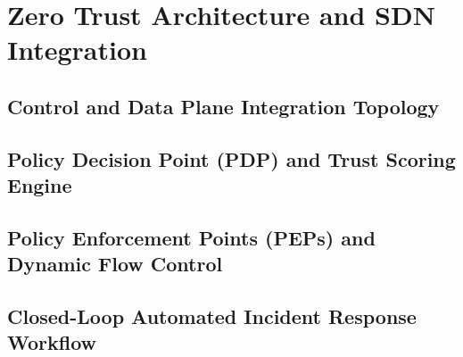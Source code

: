 \chapter{Zero Trust Architecture and SDN Integration}
\label{ch:zta_sdn_integration}


\section{Control and Data Plane Integration Topology}
\label{sec:zta_sdn_topology}

\section{Policy Decision Point (PDP) and Trust Scoring Engine}
\label{sec:pdp_trust_engine}

\section{Policy Enforcement Points (PEPs) and Dynamic Flow Control}
\label{sec:pep_flow_control}

\section{Closed-Loop Automated Incident Response Workflow}
\label{sec:closed_loop_workflow}
